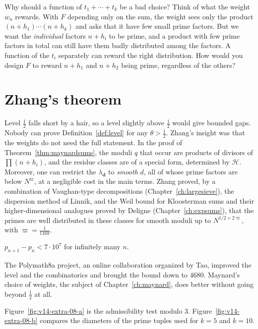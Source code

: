 \begin{think}
Why should a function of $t_1+\cdots+t_k$ be a bad choice? Think of what the weight $w_n$ rewards. With $F$ depending only on the sum, the weight sees only the product $(n+h_1)\cdots(n+h_k)$ and asks that it have few small prime factors. But we want the \emph{individual} factors $n+h_i$ to be prime, and a product with few prime factors in total can still have them badly distributed among the factors. A function of the $t_i$ separately can reward the right distribution. How would you design $F$ to reward $n+h_1$ and $n+h_2$ being prime, regardless of the others?
\end{think}

\section{Zhang's theorem}

Level $\frac12$ falls short by a hair, so a level slightly above $\frac12$ would give bounded gaps. Nobody can prove Definition~\ref{def:level} for any $\theta>\frac12$. Zhang's insight was that the weights do not need the full statement. In the proof of Theorem~\ref{thm:maynardsums}, the moduli $q$ that occur are products of divisors of $\prod(n+h_i)$, and the residue classes are of a special form, determined by $\mathcal H$. Moreover, one can restrict the $\lambda_{\mathbf d}$ to \emph{smooth} $d$, all of whose prime factors are below $N^\varpi$, at a negligible cost in the main terms. Zhang proved, by a combination of Vaughan-type decompositions (Chapter~\ref{ch:largesieve}), the dispersion method of Linnik, and the Weil bound for Kloosterman sums and their higher-dimensional analogues proved by Deligne (Chapter~\ref{ch:expsums}), that the primes are well distributed in these classes for smooth moduli up to $N^{1/2+2\varpi}$, with $\varpi=\frac1{1168}$.

\begin{theorem}\label{thm:zhang}
$p_{n+1}-p_n<7\cdot10^7$ for infinitely many $n$.
\end{theorem}

The Polymath8a project, an online collaboration organized by Tao, improved the level and the combinatorics and brought the bound down to $4680$. Maynard's choice of weights, the subject of Chapter~\ref{ch:maynard}, does better without going beyond $\frac12$ at all.

Figure~\ref{fig:v14-extra-08-a} is the admissibility test modulo $3$. Figure~\ref{fig:v14-extra-08-b} compares the diameters of the prime tuples used for $k=5$ and $k=10$.


